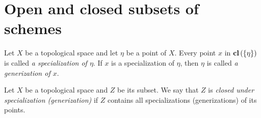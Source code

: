 \section{Open and closed subsets of schemes}

\begin{definition}
Let $X$ be a topological space and let $\eta$ be a point of $X$. Every point $x$ in $\mathbf{cl}\left(\{\eta \}\right)$ is called \textit{a specialization of $\eta$}. If $x$ is a specialization of $\eta$, then $\eta$ is called \textit{a generization of $x$}.
\end{definition}

\begin{definition}
Let $X$ be a topological space and $Z$ be its subset. We say that $Z$ is \textit{closed under specialization (generization)} if $Z$ contains all specializations (generizations) of its points.
\end{definition}

